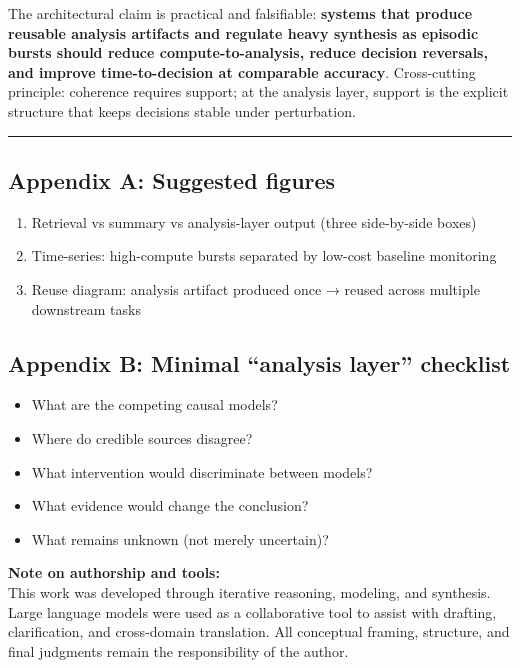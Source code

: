 \documentclass[11pt]{article}
\providecommand{\tightlist}{%
  \setlength{\itemsep}{0pt}\setlength{\parskip}{0pt}}
\begin{document}
The architectural claim is practical and falsifiable: \textbf{systems
that produce reusable analysis artifacts and regulate heavy synthesis as
episodic bursts should reduce compute-to-analysis, reduce decision
reversals, and improve time-to-decision at comparable accuracy}.
Cross-cutting principle: coherence requires support; at the analysis
layer, support is the explicit structure that keeps decisions stable
under perturbation.

\begin{center}\rule{0.5\linewidth}{0.5pt}\end{center}

\hypertarget{appendix-a-suggested-figures}{%
\subsection{Appendix A: Suggested
figures}\label{appendix-a-suggested-figures}}

\begin{enumerate}
\def\labelenumi{\arabic{enumi})}
\tightlist
\item
  Retrieval vs summary vs analysis-layer output (three side-by-side
  boxes)
\item
  Time-series: high-compute bursts separated by low-cost baseline
  monitoring
\item
  Reuse diagram: analysis artifact produced once → reused across
  multiple downstream tasks
\end{enumerate}

\hypertarget{appendix-b-minimal-analysis-layer-checklist}{%
\subsection{Appendix B: Minimal ``analysis layer''
checklist}\label{appendix-b-minimal-analysis-layer-checklist}}

\begin{itemize}
\tightlist
\item
  What are the competing causal models?
\item
  Where do credible sources disagree?
\item
  What intervention would discriminate between models?
\item
  What evidence would change the conclusion?
\item
  What remains unknown (not merely uncertain)?
\end{itemize}
\newpage

{
\noindent\textbf{Note on authorship and tools:}\\
This work was developed through iterative reasoning, modeling, and synthesis.
Large language models were used as a collaborative tool to assist with drafting,
clarification, and cross-domain translation. All conceptual framing, structure,
and final judgments remain the responsibility of the author.
}
\end{document}
